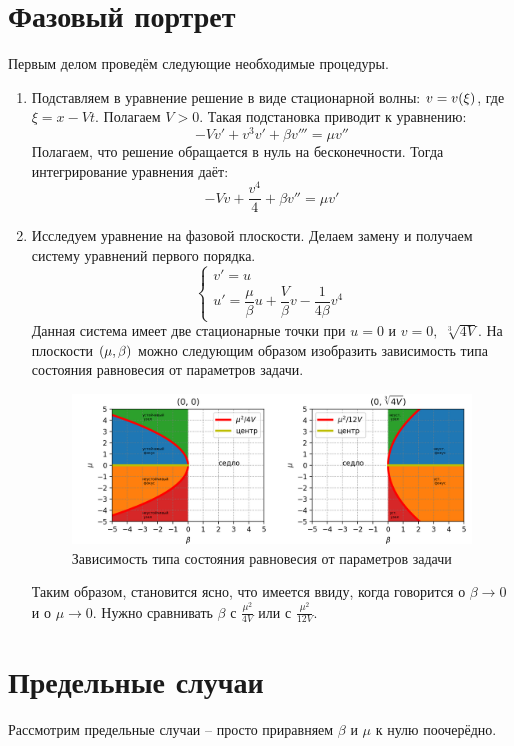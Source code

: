 \documentclass[titlepage]{article}
\begin{document}
\section{Фазовый портрет}
Первым делом проведём следующие необходимые процедуры.
\begin{enumerate}
 \item Подставляем в уравнение решение в виде стационарной волны: $v = v\qty(\xi)$, где $\xi = x - Vt$. Полагаем $V > 0$. Такая  подстановка приводит к уравнению:
 \begin{equation}
  -Vv' + v^3v' + \beta v''' = \mu v''
 \end{equation}
Полагаем, что решение обращается в нуль на бесконечности. Тогда интегрирование уравнения даёт:
\begin{equation}\label{three}
  -Vv + \dfrac{v^4}{4} + \beta v'' = \mu v'
\end{equation}
\item \label{bla} Исследуем уравнение на фазовой плоскости. Делаем замену и получаем систему уравнений первого порядка.
$$
\begin{cases}
    v'= u \\
    u'= \dfrac{\mu}{\beta}u + \dfrac{V}{\beta}v - \dfrac1{4\beta} v^4
\end{cases}
$$
Данная система имеет две стационарные точки при $u = 0$ и $v = 0,$ $\sqrt[3]{4V}$. На плоскости $\qty(\mu,\beta)$ можно следующим образом изобразить зависимость типа состояния равновесия от параметров задачи.
\begin{figure}[h]
 \includegraphics[width = 170 mm]{00.png}
 \caption{Зависимость типа состояния равновесия от параметров задачи}
\end{figure}
\par
Таким образом, становится ясно, что имеется ввиду, когда говорится о $\beta \longrightarrow 0$ и о $\mu \longrightarrow 0$. Нужно сравнивать $\beta$ с $\frac{\mu^2}{4V}$ или с $\frac{\mu^2}{12V}$.
\end{enumerate}

\section{Предельные случаи}
Рассмотрим предельные случаи \--- просто приравняем $\beta$ и $\mu$ к нулю поочерёдно.
\end{document}

